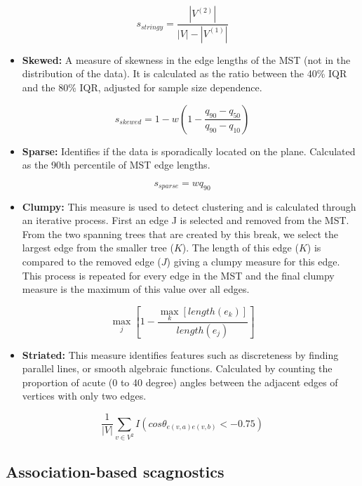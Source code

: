 \[s_{stringy} = \frac{|V^{(2)}|}{|V|-|V^{(1)}|}\]

\begin{itemize}
\tightlist
\item
  \textbf{Skewed:} A measure of skewness in the edge lengths of the MST
  (not in the distribution of the data). It is calculated as the ratio
  between the 40\% IQR and the 80\% IQR, adjusted for sample size
  dependence.
\end{itemize}

\[s_{skewed} = 1-w(1-\frac{q_{90}-{q_{50}}}{q_{90}-q_{10}})\]

\begin{itemize}
\tightlist
\item
  \textbf{Sparse:} Identifies if the data is sporadically located on the
  plane. Calculated as the 90th percentile of MST edge lengths.
\end{itemize}

\[s_{sparse}= wq_{90}\]

\begin{itemize}
\tightlist
\item
  \textbf{Clumpy:} This measure is used to detect clustering and is
  calculated through an iterative process. First an edge J is selected
  and removed from the MST. From the two spanning trees that are created
  by this break, we select the largest edge from the smaller tree
  (\(K\)). The length of this edge (\(K\)) is compared to the removed
  edge (\(J\)) giving a clumpy measure for this edge. This process is
  repeated for every edge in the MST and the final clumpy measure is the
  maximum of this value over all edges.
\end{itemize}

\[\max_{j}[1-\frac{\max_{k}[length(e_k)]}{length(e_j)}]\]

\begin{itemize}
\tightlist
\item
  \textbf{Striated:} This measure identifies features such as
  discreteness by finding parallel lines, or smooth algebraic functions.
  Calculated by counting the proportion of acute (0 to 40 degree) angles
  between the adjacent edges of vertices with only two edges.
\end{itemize}

\[\frac1{|V|}\sum_{v \in V^{2}}I(cos\theta_{e(v,a)e(v,b)}<-0.75)\]

\hypertarget{association-based-scagnostics}{%
\subsection{Association-based
scagnostics}\label{association-based-scagnostics}}

